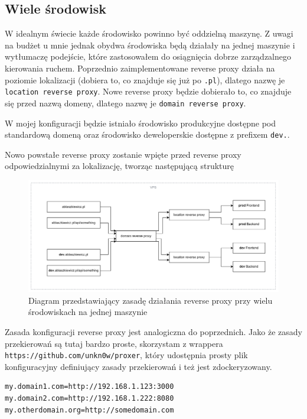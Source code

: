 \documentclass{article}
\begin{document}
\subsection{Wiele środowisk}

W idealnym świecie każde środowisko powinno być oddzielną maszynę. Z uwagi na budżet u mnie jednak obydwa środowiska będą działały na jednej maszynie i wytłumaczę podejście, które zastosowałem do osiągnięcia dobrze zarządzalnego kierowania ruchem. Poprzednio zaimplementowane reverse proxy działa na poziomie lokalizacji (dobiera to, co znajduje się już po \lstinline|.pl|), dlatego nazwę je \lstinline|location reverse proxy|. Nowe reverse proxy będzie dobierało to, co znajduje się przed nazwą domeny, dlatego nazwę je \lstinline|domain reverse proxy|.

W mojej konfiguracji będzie istniało środowisko produkcyjne dostępne pod standardową domeną oraz środowisko deweloperskie dostępne z prefixem \lstinline|dev.|.

Nowo powstałe reverse proxy zostanie wpięte przed reverse proxy odpowiedzialnymi za lokalizację, tworząc następującą strukturę

\begin{figure}[H]
    \centering
    \includegraphics[width=1\linewidth]{domainReverseProxy.png}
    \caption{Diagram przedstawiający zasadę działania reverse proxy przy wielu środowiskach na jednej maszynie}
    \label{fig:enter-label}
\end{figure}


Zasada konfiguracji reverse proxy jest analogiczna do poprzednich. Jako że zasady przekierowań są tutaj bardzo proste, skorzystam z wrappera \lstinline|https://github.com/unkn0w/proxer|, który udostępnia prosty plik konfiguracyjny definiujący zasady przekierowań i też jest zdockeryzowany.

\begin{lstlisting}[caption=Plik \lstinline|/infrastructure/reverse-proxy/src/nxconf.sh|]
my.domain1.com=http://192.168.1.123:3000
my.domain2.com=http://192.168.1.222:8080
my.otherdomain.org=http://somedomain.com
\end{lstlisting}
\end{document}
